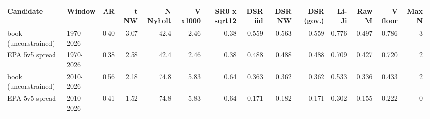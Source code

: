 \begin{adjustbox}{max width=\linewidth}
\begin{tabular}{llrrrrrrrrrrrr}
\toprule
Candidate & Window & AR & t NW & N Nyholt & V x1000 & SR0 x sqrt12 & DSR iid & DSR NW & DSR (gov.) & Li-Ji & Raw M & V floor & Max N \\
\midrule
book (unconstrained) & 1970-2026 & 0.40 & 3.07 & 42.4 & 2.46 & 0.38 & 0.559 & 0.563 & 0.559 & 0.776 & 0.497 & 0.786 & 3 \\
EPA 5v5 spread & 1970-2026 & 0.38 & 2.58 & 42.4 & 2.46 & 0.38 & 0.488 & 0.488 & 0.488 & 0.709 & 0.427 & 0.720 & 2 \\
book (unconstrained) & 2010-2026 & 0.56 & 2.18 & 74.8 & 5.83 & 0.64 & 0.363 & 0.362 & 0.362 & 0.533 & 0.336 & 0.433 & 2 \\
EPA 5v5 spread & 2010-2026 & 0.41 & 1.52 & 74.8 & 5.83 & 0.64 & 0.171 & 0.182 & 0.171 & 0.302 & 0.155 & 0.222 & 0 \\
\bottomrule
\end{tabular}
\end{adjustbox}
\par{}
